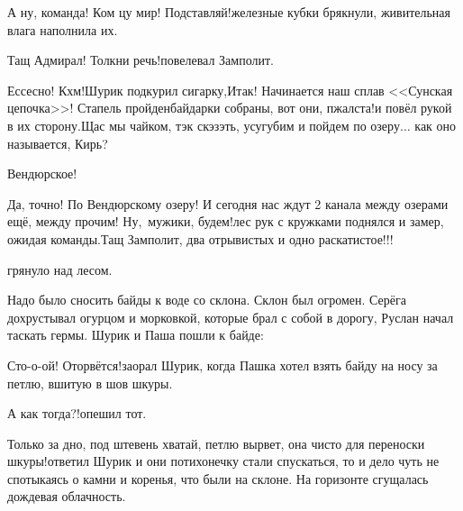 \diagdash А ну, команда! Ком цу мир! Подставляй!\mdash железные кубки брякнули, живительная влага наполнила их.

\diagdash Тащ Адмирал! Толкни речь!\mdash повелевал Замполит.

\diagdash Ессесно! Кхм!\mdash Шурик подкурил сигарку,\mdash Итак! Начинается наш сплав <<Сунская цепочка>>! Стапель пройден\mdash байдарки собраны, вот они, пжалста!\mdash и повёл рукой в их сторону.\mdash Щас мы чайком, тэк скэзэть, усугубим и пойдем по озеру$\ldots$ как оно называется, Кирь?

\diagdash Вендюрское! 

\diagdash Да, точно! По Вендюрскому озеру! И сегодня нас ждут 2 канала между озерами ещё, между прочим! Ну,~мужики, будем!\mdash лес рук с кружками поднялся и замер, ожидая команды.\mdash Тащ Замполит, два отрывистых и одно раскатистое!!!

\mdash грянуло над лесом.

Надо было сносить байды к воде со склона. Склон был огромен. Серёга дохрустывал огурцом и морковкой, которые брал с собой в дорогу, Руслан начал таскать гермы. Шурик и Паша пошли к байде:

\diagdash Сто-о-ой! Оторвётся!\mdash заорал Шурик, когда Пашка хотел взять байду на носу за петлю, вшитую в шов шкуры.

\diagdash А как тогда?!\mdash опешил тот.

\diagdash Только за дно, под штевень хватай, петлю вырвет, она чисто для переноски шкуры!\mdash ответил Шурик и они потихонечку стали спускаться, то и дело чуть не спотыкаясь о камни и коренья, что были на склоне. На горизонте сгущалась дождевая облачность.






\begin{center}
\end{center}
